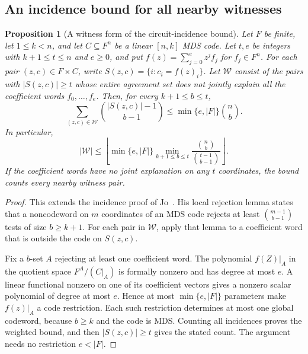 \documentclass[11pt,letterpaper]{article}
\newtheorem{proposition}[theorem]{Proposition}
\theoremstyle{definition}
\theoremstyle{remark}
\begin{document}
\subsection{An incidence bound for all nearby witnesses}

\begin{proposition}[A witness form of the circuit-incidence bound]
\label{prop:support-incidence}
Let $F$ be finite, let $1\le k<n$, and let $C\subseteq F^n$ be
a linear $[n,k]$ MDS code. Let $t,e$ be integers with
$k+1\le t\le n$ and $e\ge0$, and put
$f(z)=\sum_{j=0}^e z^j f_j$ for $f_j\in F^n$.
For each pair $(z,c)\in F\times C$, write
$S(z,c)=\{i:c_i=f(z)_i\}$. Let $\mathcal W$ consist of the
pairs with $|S(z,c)|\ge t$ whose entire agreement set does not
jointly explain all the coefficient words $f_0,\ldots,f_e$.
Then, for every $k+1\le b\le t$,
\[
 \sum_{(z,c)\in\mathcal W}\binom{|S(z,c)|-1}{b-1}
 \le \min\{e,|F|\}\binom nb.
\]
In particular,
\[
 |\mathcal W|\le
 \left\lfloor\min\{e,|F|\}
 \min_{k+1\le b\le t}\frac{\binom nb}{\binom{t-1}{b-1}}
 \right\rfloor.
\]
If the coefficient words have no joint explanation on any $t$
coordinates, the bound counts every nearby witness pair.
\end{proposition}
\begin{proof}
This extends the incidence proof of Jo~\cite[Lemma~4.1 and
Theorem~4.2]{jo-mca}. His local rejection lemma states that a
noncodeword on $m$ coordinates of an MDS code rejects at least
$\binom{m-1}{b-1}$ tests of size $b\ge k+1$.
For each pair in $\mathcal W$, apply that lemma to a coefficient
word that is outside the code on $S(z,c)$.

Fix a $b$-set $A$ rejecting at least one coefficient word. The
polynomial $f(Z)|_A$ in the quotient space $F^A/(C|_A)$ is
formally nonzero and has degree at most $e$. A linear functional
nonzero on one of its coefficient vectors gives a nonzero scalar
polynomial of degree at most $e$. Hence at most
$\min\{e,|F|\}$ parameters make $f(z)|_A$ a code restriction.
Each such restriction determines at most one global codeword,
because $b\ge k$ and the code is MDS. Counting all incidences
proves the weighted bound, and then $|S(z,c)|\ge t$ gives the
stated count. The argument needs no restriction $e<|F|$.
\end{proof}
\end{document}
